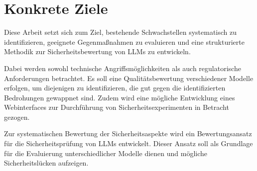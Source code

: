 \documentclass[german,exposee,master]{i1thesis}
\begin{document}
\section{Konkrete Ziele}\label{sec:konkreteziele}

Diese Arbeit setzt sich zum Ziel, bestehende Schwachstellen systematisch zu identifizieren, 
geeignete Gegenmaßnahmen zu evaluieren und eine strukturierte Methodik zur Sicherheitsbewertung von LLMs zu entwickeln.

Dabei werden sowohl technische Angriffsmöglichkeiten als auch regulatorische Anforderungen betrachtet. 
Es soll eine Qualitätsbewertung verschiedener Modelle erfolgen, um diejenigen zu identifizieren, 
die gut gegen die identifizierten Bedrohungen gewappnet sind. 
Zudem wird eine mögliche Entwicklung eines Webinterfaces zur Durchführung von Sicherheitsexperimenten in Betracht gezogen.

Zur systematischen Bewertung der Sicherheitsaspekte wird ein Bewertungsansatz für die Sicherheitsprüfung von LLMs entwickelt. 
Dieser Ansatz soll als Grundlage für die Evaluierung unterschiedlicher Modelle dienen und mögliche Sicherheitslücken aufzeigen.











\end{document}
